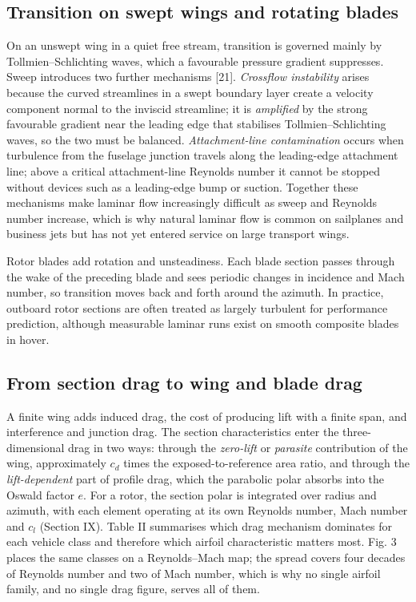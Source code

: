 \documentclass[10pt,a4paper,twocolumn]{article}
\begin{document}
\hypertarget{transition-on-swept-wings-and-rotating-blades}{%
\subsection{Transition on swept wings and rotating
blades}\label{transition-on-swept-wings-and-rotating-blades}}

On an unswept wing in a quiet free stream, transition is governed mainly
by Tollmien--Schlichting waves, which a favourable pressure gradient
suppresses. Sweep introduces two further mechanisms {[}21{]}.
\emph{Crossflow instability} arises because the curved streamlines in a
swept boundary layer create a velocity component normal to the inviscid
streamline; it is \emph{amplified} by the strong favourable gradient
near the leading edge that stabilises Tollmien--Schlichting waves, so
the two must be balanced. \emph{Attachment-line contamination} occurs
when turbulence from the fuselage junction travels along the
leading-edge attachment line; above a critical attachment-line Reynolds
number it cannot be stopped without devices such as a leading-edge bump
or suction. Together these mechanisms make laminar flow increasingly
difficult as sweep and Reynolds number increase, which is why natural
laminar flow is common on sailplanes and business jets but has not yet
entered service on large transport wings.

Rotor blades add rotation and unsteadiness. Each blade section passes
through the wake of the preceding blade and sees periodic changes in
incidence and Mach number, so transition moves back and forth around the
azimuth. In practice, outboard rotor sections are often treated as
largely turbulent for performance prediction, although measurable
laminar runs exist on smooth composite blades in hover.

\hypertarget{from-section-drag-to-wing-and-blade-drag}{%
\subsection{From section drag to wing and blade
drag}\label{from-section-drag-to-wing-and-blade-drag}}

A finite wing adds induced drag, the cost of producing lift with a
finite span, and interference and junction drag. The section
characteristics enter the three-dimensional drag in two ways: through
the \emph{zero-lift} or \emph{parasite} contribution of the wing,
approximately \(c_d\) times the exposed-to-reference area ratio, and
through the \emph{lift-dependent} part of profile drag, which the
parabolic polar absorbs into the Oswald factor \(e\). For a rotor, the
section polar is integrated over radius and azimuth, with each element
operating at its own Reynolds number, Mach number and \(c_l\) (Section
IX). Table II summarises which drag mechanism dominates for each vehicle
class and therefore which airfoil characteristic matters most. Fig. 3
places the same classes on a Reynolds--Mach map; the spread covers four
decades of Reynolds number and two of Mach number, which is why no
single airfoil family, and no single drag figure, serves all of them.
\end{document}
